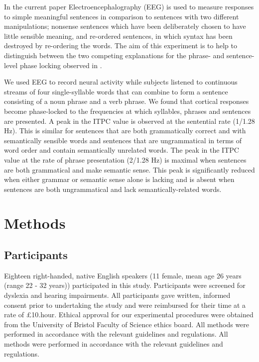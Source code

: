 \documentclass[a4paper,10pt,twoside]{article}
\begin{document}
In the current paper Electroencephalography (EEG) is used to measure responses to
simple meaningful sentences in comparison to sentences with two different
manipulations; nonsense sentences which have been deliberately chosen
to have little sensible meaning, and re-ordered sentences, in which
syntax has been destroyed by re-ordering the words. The aim of this
experiment is to help to distinguish between the two competing
explanations for the phrase- and sentence-level phase locking observed
in \cite{DingEtAl2016,DingEtAl2017}.

We used EEG to record neural activity while subjects listened to continuous streams of four single-syllable words that can combine to form a sentence consisting of a noun phrase and a verb phrase. We found that cortical responses become phase-locked to the frequencies at which syllables, phrases and
sentences are presented. A peak in the ITPC value is observed at the sentential rate (1/1.28 Hz). This is similar for sentences that are both grammatically correct and with semantically sensible words and sentences that are ungrammatical in terms of word order and contain semantically
 unrelated words. The peak in the ITPC value at the rate of phrase presentation
 (2/1.28 Hz) is maximal when sentences are both grammatical and make
 semantic sense. This peak is significantly reduced when either grammar or
 semantic sense alone is lacking and is absent when sentences are both ungrammatical and
 lack semantically-related words. 


\section*{Methods}
\subsection*{Participants}

Eighteen right-handed, native English speakers (11 female, mean age 26
years (range 22 - 32 years)) participated in this study. Participants were screened for dyslexia and hearing impairments. All
participants gave written, informed consent prior to undertaking the
study and were reimbursed for their time at a rate of £10.hour. Ethical approval for our experimental procedures were obtained from the University of Bristol Faculty of Science ethics board. All methods were performed in accordance with the relevant guidelines and regulations. All methods were performed in accordance with the relevant guidelines and regulations.
\end{document}
